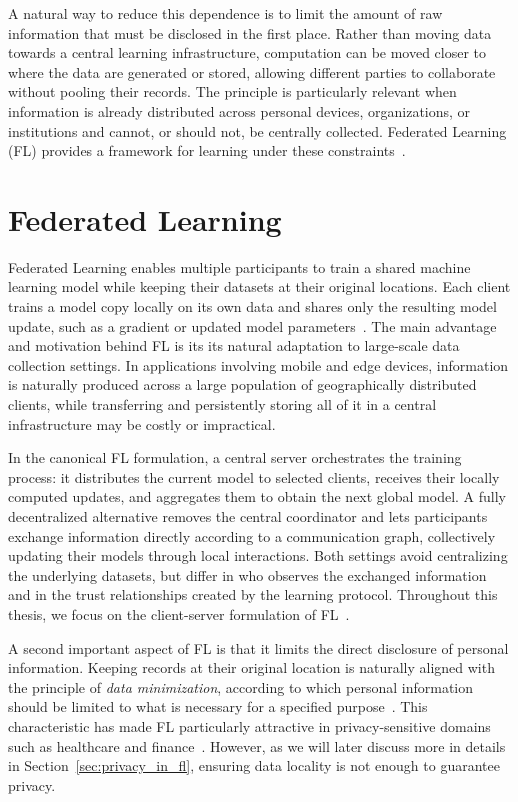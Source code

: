 A natural way to reduce this dependence is to limit the amount of raw information that must be disclosed in the first place. Rather than moving data towards a central learning infrastructure, computation can be moved closer to where the data are generated or stored, allowing different parties to collaborate without pooling their records. The principle is particularly relevant when information is already distributed across personal devices, organizations, or institutions and cannot, or should not, be centrally collected. Federated Learning (FL) provides a framework for learning under these constraints~\cite{pmlr-v54-mcmahan17a}.


\section{Federated Learning} \label{sec:fed_learning}

Federated Learning enables multiple participants to train a shared machine learning model while keeping their datasets at their original locations. Each client trains a model copy locally on its own data and shares only the resulting model update, such as a gradient or updated model parameters~\cite{konecny2015federatedoptimizationdistributedoptimizationdatacenter, pmlr-v54-mcmahan17a}.
The main advantage and motivation behind  FL is its its natural adaptation to large-scale data collection settings. In applications involving mobile and edge devices, information is naturally produced across a large population of geographically distributed clients, while transferring and persistently storing all of it in a central infrastructure may be costly or impractical. 

 In the canonical FL formulation, a central server orchestrates the training process: it distributes the current model to selected clients, receives their locally computed updates, and aggregates them to obtain the next global model. A fully decentralized alternative removes the central coordinator and lets participants exchange information directly according to a communication graph, collectively updating their models through local interactions. Both settings avoid centralizing the underlying datasets, but differ in who observes the exchanged information and in the trust relationships created by the learning protocol. Throughout this thesis, we focus on the client-server formulation of FL~\cite{pmlr-v54-mcmahan17a}.

A second important aspect of FL is that it  limits the direct disclosure of personal information. Keeping records at their original location is naturally aligned with the principle of \emph{data minimization}, according to which personal information should be limited to what is necessary for a specified purpose~\cite{eu_gdpr_2016,eu_regulation_2018_1725,TRUONG2021102402}. This characteristic has made FL particularly attractive in privacy-sensitive domains such as healthcare and finance~\cite{Rieke2020,ZHANG2021106775,10.1145/3298981}. However, as we will later discuss more in details in Section~\ref{sec:privacy_in_fl}, ensuring data locality is not enough to guarantee privacy.
